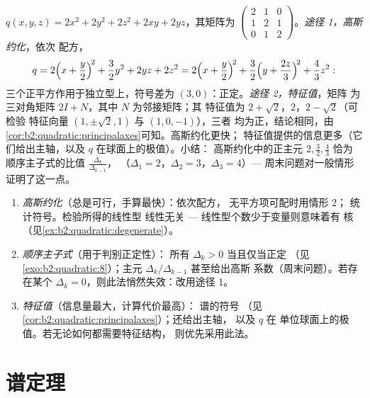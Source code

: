 \begin{example}\label{ex:b2:quadratic:tworoads}
$q(x, y, z) = 2x^2 + 2y^2 + 2z^2 + 2xy + 2yz$，其矩阵为
$\begin{pmatrix} 2 & 1 & 0\\ 1 & 2 & 1\\ 0 & 1 & 2
\end{pmatrix}$。\emph{途径 1，高斯约化}，依次
配方，
\[
q = 2\Bigl(x + \frac y2\Bigr)^{\!2} + \frac32 y^2 + 2yz + 2z^2
= 2\Bigl(x + \frac y2\Bigr)^{\!2}
+ \frac32\Bigl(y + \frac{2z}{3}\Bigr)^{\!2} + \frac43 z^2 :
\]
三个正平方作用于独立型上，符号差为 $(3,
0)$：正定。\emph{途径 2，特征值}，矩阵
为三对角矩阵 $2I + N$，其中 $N$ 为邻接矩阵；其
特征值为 $2 + \sqrt2$，$2$，$2 - \sqrt2$（可检验
特征向量 $(1, \pm\sqrt2, 1)$ 与 $(1, 0, -1)$），三者
均为正，结论相同，由
\cref{cor:b2:quadratic:principalaxes}可知。高斯约化更快；
特征值提供的信息更多（它们给出主轴，以及
$q$ 在球面上的极值）。小结：
高斯约化中的正主元 $2, \frac32, \frac43$ 恰为
顺序主子式的比值 $\frac{\Delta_k}{\Delta_{k-1}}$，
（$\Delta_1 = 2$，$\Delta_2 = 3$，$\Delta_3 = 4$）---
周末问题对一般情形证明了这一点。
\end{example}

\begin{method}\label{met:b2:quadratic:signature}
\begin{enumerate}
  \item \emph{高斯约化}（总是可行，手算最快）：依次配方，
        无平方项可配时用情形 2；
        统计符号。检验所得的线性型
        线性无关 --- 线性型个数少于变量则意味着有
        核（见\cref{ex:b2:quadratic:degenerate}）。
  \item \emph{顺序主子式}（用于判别正定性）：
        所有 $\Delta_k > 0$ 当且仅当正定
        （见\cref{exo:b2:quadratic:8}）；主元
        $\Delta_k/\Delta_{k-1}$ 甚至给出高斯
        系数（周末问题）。若存在某个
        $\Delta_k = 0$，则此法悄然失效：改用途径 1。
  \item \emph{特征值}（信息量最大，计算代价最高）：
        谱的符号
        （见\cref{cor:b2:quadratic:principalaxes}）；还给出主轴，
        以及 $q$ 在
        单位球面上的极值。若无论如何都需要特征结构，
        则优先采用此法。
\end{enumerate}
\end{method}

\section{谱定理}

